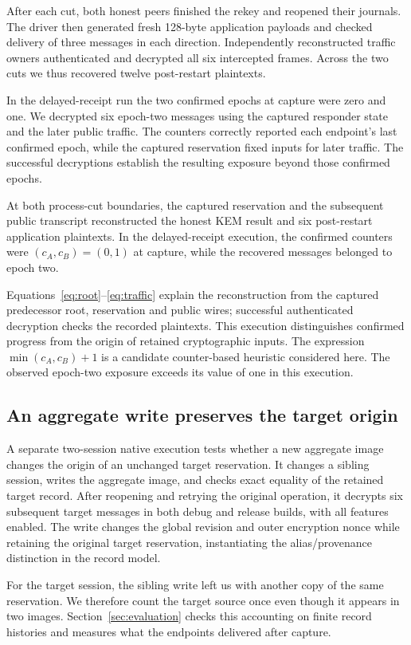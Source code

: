After each cut, both honest peers finished the rekey and reopened their
journals. The driver then generated fresh 128-byte application
payloads and checked delivery of three messages in each direction.
Independently reconstructed traffic owners authenticated and decrypted
all six intercepted frames. Across the two cuts we thus recovered
twelve post-restart plaintexts.

In the delayed-receipt run the two confirmed epochs at capture were
zero and one. We decrypted six epoch-two messages using the captured
responder state and the later public traffic. The counters correctly
reported each endpoint's last confirmed epoch, while the captured
reservation fixed inputs for later traffic. The successful decryptions
establish the resulting exposure beyond those confirmed epochs.

\begin{observation}
\label{prop:counter-separation}
At both process-cut boundaries, the captured reservation and the subsequent
public transcript reconstructed the honest KEM result and six post-restart
application plaintexts. In the delayed-receipt execution, the confirmed
counters were $(c_A,c_B)=(0,1)$ at capture, while the recovered messages
belonged to epoch two.
\end{observation}

Equations~\eqref{eq:root}--\eqref{eq:traffic} explain the reconstruction
from the captured predecessor root, reservation and public wires; successful
authenticated decryption checks the recorded plaintexts. This execution
distinguishes confirmed progress from the origin of retained cryptographic
inputs. The expression $\min(c_A,c_B)+1$ is a candidate counter-based
heuristic considered here. The observed epoch-two exposure exceeds its
value of one in this execution.

\subsection{An aggregate write preserves the target origin}

A separate two-session native execution tests whether a new aggregate
image changes the origin of an unchanged target reservation. It changes a
sibling session, writes the aggregate image, and checks exact equality of
the retained target record. After reopening and retrying the original
operation, it decrypts six subsequent target messages in both debug and
release builds, with all features enabled. The write changes the global
revision and outer encryption nonce while retaining the original target
reservation, instantiating the alias/provenance distinction in the record model.

For the target session, the sibling write left us with another copy of the
same reservation. We therefore count the target source once even though it
appears in two images. Section~\ref{sec:evaluation} checks this accounting
on finite record histories and measures what the endpoints delivered after
capture.
